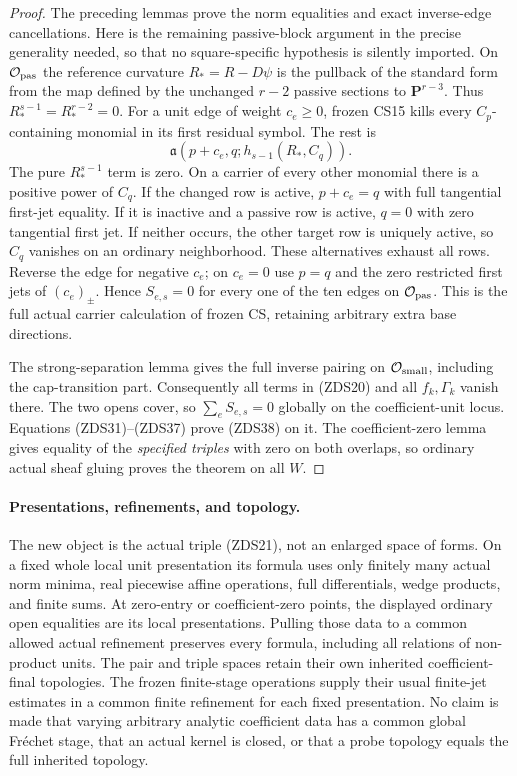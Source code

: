 \begin{proof}
The preceding lemmas prove the norm equalities and exact inverse-edge
cancellations.  Here is the remaining passive-block argument in the
precise generality needed, so that no square-specific hypothesis is
silently imported.  On $\mathcal O_{\rm pas}$ the reference curvature
$R_*=R-D\psi$ is the pullback of the standard form from the map
defined by the unchanged $r-2$ passive sections to $\mathbf P^{r-3}$.
Thus $R_*^{s-1}=R_*^{r-2}=0$.  For a unit edge of weight $c_e\ge0$,
frozen CS15 kills every $C_p$-containing monomial in its first
residual symbol.  The rest is
\[
          \mathfrak a(p+c_e,q;h_{s-1}(R_*,C_q)).
 \tag{ZDS39}
\]
The pure $R_*^{s-1}$ term is zero.  On a carrier of every other
monomial there is a positive power of $C_q$.  If the changed row
is active, $p+c_e=q$ with full tangential first-jet equality.  If
it is inactive and a passive row is active, $q=0$ with zero
tangential first jet.  If neither occurs, the other target row
is uniquely active, so $C_q$ vanishes on an ordinary neighborhood.
These alternatives exhaust all rows.  Reverse the edge for negative
$c_e$; on $c_e=0$ use $p=q$ and the zero restricted first jets of
$(c_e)_\pm$.  Hence $S_{e,s}=0$ for every one of the ten edges
on $\mathcal O_{\rm pas}$.  This is the full actual carrier
calculation of frozen CS, retaining arbitrary extra base directions.

The strong-separation lemma gives the full inverse pairing on
$\mathcal O_{\rm small}$, including the cap-transition part.
Consequently all terms in (ZDS20) and all $f_k,\Gamma_k$ vanish
there.  The two opens cover, so $\sum_eS_{e,s}=0$ globally on
the coefficient-unit locus.  Equations (ZDS31)--(ZDS37) prove
(ZDS38) on it.  The coefficient-zero lemma gives equality of
the \emph{specified triples} with zero on both overlaps, so
ordinary actual sheaf gluing proves the theorem on all $W$.
\end{proof}

\paragraph{Presentations, refinements, and topology.}
The new object is the actual triple (ZDS21), not an enlarged space
of forms.  On a fixed whole local unit presentation its formula
uses only finitely many actual norm minima, real piecewise affine
operations, full differentials, wedge products, and finite sums.
At zero-entry or coefficient-zero points, the displayed ordinary
open equalities are its local presentations.  Pulling those data
to a common allowed actual refinement preserves every formula,
including all relations of non-product units.  The pair and triple
spaces retain their own inherited coefficient-final topologies.
The frozen finite-stage operations supply their usual finite-jet
estimates in a common finite refinement for each fixed presentation.
No claim is made that varying arbitrary analytic coefficient data
has a common global Fr\'echet stage, that an actual kernel is closed,
or that a probe topology equals the full inherited topology.

